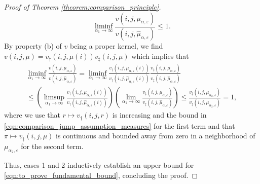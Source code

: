 \documentclass[a4paper]{article}
\numberwithin{equation}{section}
\theoremstyle{definition}
\begin{document}
\begin{proof}[Proof of Theorem \ref{theorem:comparison_principle}]
	\begin{equation*}
		\liminf_{\alpha_1 \rightarrow \infty} \frac{v(i,j,\mu_{\alpha,\varepsilon})}{v(i,j,\hat{\mu}_{\alpha,\varepsilon})} \leq 1.
	\end{equation*}
	By property (b) of $v$ being a proper kernel, we find $v(i,j,\mu) = v_\dagger(i,j,\mu(i))v_\ddagger(i,j,\mu)$ which implies that
	\begin{multline*}
		\liminf_{\alpha_1 \rightarrow \infty} \frac{v(i,j,\mu_{\alpha,\varepsilon})}{v(i,j,\hat{\mu}_{\alpha,\varepsilon})} = \liminf_{\alpha_1 \rightarrow \infty} \frac{v_\dagger(i,j,\mu_{\alpha,\varepsilon}(i))}{v_\dagger(i,j,\hat{\mu}_{\alpha,\varepsilon}(i))}\frac{v_\ddagger(i,j,\mu_{\alpha,\varepsilon})}{v_\ddagger(i,j,\hat{\mu}_{\alpha,\varepsilon})} \\
		\leq \left(\limsup_{\alpha_1 \rightarrow \infty} \frac{v_\dagger(i,j,\mu_{\alpha,\varepsilon}(i))}{v_\dagger(i,j,\hat{\mu}_{\alpha,\varepsilon}(i))}\right) \left( \lim_{\alpha_1  \rightarrow \infty}\frac{v_\ddagger(i,j,\mu_{\alpha,\varepsilon})}{v_\ddagger(i,j,\hat{\mu}_{\alpha,\varepsilon})} \right) \leq \frac{v_\ddagger(i,j,\mu_{\alpha_2,\varepsilon})}{v_\ddagger(i,j,\mu_{\alpha_2,\varepsilon})} = 1,
	\end{multline*} 
	where we use that $r \mapsto v_{\dagger}(i,j,r)$ is increasing and the bound in \eqref{eqn:comparison_jump_assumption_measures} for the first term and that $\pi \mapsto v_\ddagger(i,j,\mu)$ is continuous and bounded away from zero in a neighborhood of $\mu_{\alpha_2,\varepsilon}$ for the second term.
	
	Thus, cases 1 and 2 inductively establish an upper bound for \eqref{eqn:to_prove_fundamental_bound}, concluding the proof.
\end{proof}
\end{document}
